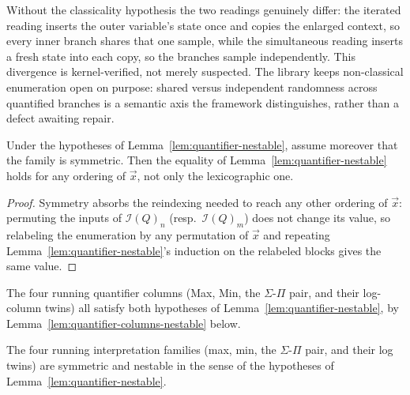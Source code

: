 Without the classicality hypothesis the two readings genuinely differ:
the iterated reading inserts the outer variable's state once and
copies the enlarged context, so every inner branch shares that one
sample, while the simultaneous reading inserts a fresh state into each
copy, so the branches sample independently. This divergence is
kernel-verified, not merely suspected. The library keeps non-classical
enumeration open on purpose: shared versus independent randomness
across quantified branches is a semantic axis the framework
distinguishes, rather than a defect awaiting repair.

\begin{lemma}
\label{lem:quantifier-nestable-order}
Under the hypotheses of Lemma~\ref{lem:quantifier-nestable}, assume
moreover that the family is symmetric. Then the equality of
Lemma~\ref{lem:quantifier-nestable} holds for any ordering of $\vec x$,
not only the lexicographic one.
\end{lemma}

\begin{proof}
Symmetry absorbs the reindexing needed to reach any other ordering of
$\vec x$: permuting the inputs of $\mathcal I(Q)_n$ (resp.\ $\mathcal
I(Q)_m$) does not change its value, so relabeling the enumeration by
any permutation of $\vec x$ and repeating Lemma~\ref{lem:quantifier-nestable}'s
induction on the relabeled blocks gives the same value.
\end{proof}

The four running quantifier columns (Max, Min, the $\Sigma$-$\Pi$ pair,
and their log-column twins) all satisfy both hypotheses of
Lemma~\ref{lem:quantifier-nestable}, by
Lemma~\ref{lem:quantifier-columns-nestable} below.

\begin{lemma}
\label{lem:quantifier-columns-nestable}
\leanok
The four running interpretation families (max, min, the $\Sigma$-$\Pi$
pair, and their log twins) are symmetric and nestable in the sense of
the hypotheses of Lemma~\ref{lem:quantifier-nestable}.
\end{lemma}

